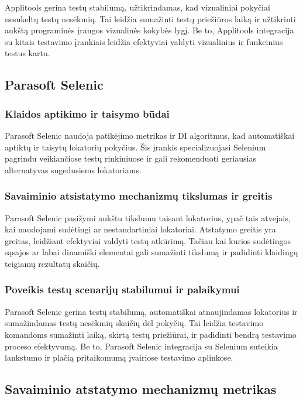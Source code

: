 \documentclass[
]{VUMIFPSkursinis}
\begin{document}
Applitools gerina testų stabilumą, užtikrindamas, kad vizualiniai pokyčiai nesukeltų testų nesėkmių. Tai leidžia sumažinti testų priežiūros laiką ir užtikrinti aukštą programinės įrangos vizualinės kokybės lygį. Be to, Applitools integracija su kitais testavimo įrankiais leidžia efektyviai valdyti vizualinius ir funkcinius testus kartu.

\subsection{Parasoft Selenic}

\subsubsection{Klaidos aptikimo ir taisymo būdai}

Parasoft Selenic naudoja patikėjimo metrikas ir DI algoritmus, kad automatiškai aptiktų ir taisytų lokatorių pokyčius. Šis įrankis specializuojasi Selenium pagrindu veikiančiose testų rinkiniuose ir gali rekomenduoti geriausias alternatyvas sugedusiems lokatoriams.

\subsubsection{Savaiminio atsistatymo mechanizmų tikslumas ir greitis}

Parasoft Selenic pasižymi aukštu tikslumu taisant lokatorius, ypač tais atvejais, kai naudojami sudėtingi ar nestandartiniai lokatoriai. Atstatymo greitis yra greitas, leidžiant efektyviai valdyti testų atkūrimą. Tačiau kai kurios sudėtingos sąsajos ar labai dinamiški elementai gali sumažinti tikslumą ir padidinti klaidingų teigiamų rezultatų skaičių.

\subsubsection{Poveikis testų scenarijų stabilumui ir palaikymui}

Parasoft Selenic gerina testų stabilumą, automatiškai atnaujindamas lokatorius ir sumažindamas testų nesėkmių skaičių dėl pokyčių. Tai leidžia testavimo komandoms sumažinti laiką, skirtą testų priežiūrai, ir padidinti bendrą testavimo proceso efektyvumą. Be to, Parasoft Selenic integracija su Selenium suteikia lankstumo ir plačią pritaikomumą įvairiose testavimo aplinkose.

\subsection{Savaiminio atstatymo mechanizmų metrikas}
\end{document}
